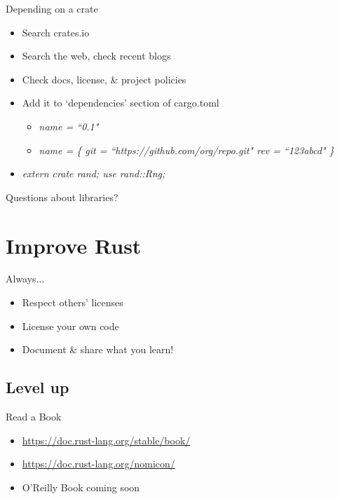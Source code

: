 \documentclass[aspectratio=169]{beamer}
\begin{document}
\begin{frame}[fragile]
    Depending on a crate
    \begin{itemize}
        \item Search crates.io
        \item Search the web, check recent blogs
        \item Check docs, license, \& project policies
        \item Add it to `dependencies' section of cargo.toml
        \begin{itemize}
            \item \textit{ name = ``0.1" }
            \item \textit{ name = \{ git = ``https://github.com/org/repo.git" rev = ``123abcd" \} }
        \end{itemize}
        \item \textit{ extern crate rand; use rand::Rng; }
    \end{itemize}
\end{frame}

\begin{frame}
    \hfill Questions about libraries?
\end{frame}

\section{Improve Rust}

\begin{frame}
    Always...
    \begin{itemize}
        \item Respect others' licenses
        \item License your own code
        \item Document \& share what you learn!
    \end{itemize}
\end{frame}


\subsection{Level up}

\begin{frame}
    Read a Book
    \begin{itemize}
        \item \url{https://doc.rust-lang.org/stable/book/}
        \item \url{https://doc.rust-lang.org/nomicon/}
        \item O'Reilly Book coming soon
    \end{itemize}
\end{frame}
\end{document}
